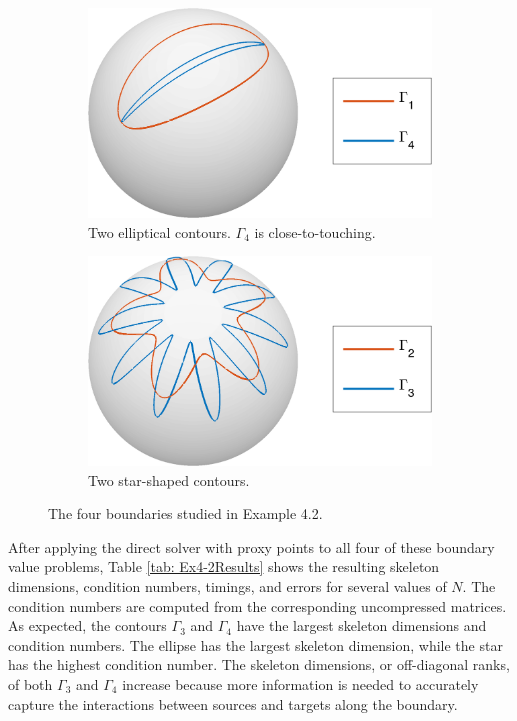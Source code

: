 \documentclass{sfuthesis}
\begin{document}
\begin{figure}[h]
        \centering
        \begin{subfigure}[b]{0.45\textwidth}
        		\includegraphics[width=\textwidth]{Ex4-2Gamma1and4}
			\caption{Two elliptical contours. $\Gamma_4$ is close-to-touching. }
     \end{subfigure} \hspace{0.5cm}
      \begin{subfigure}[b]{0.45\textwidth}
                \includegraphics[width=\textwidth]{Ex4-2Gamma2and3}
                \caption{Two star-shaped contours. \vspace{0.3cm}}
       \end{subfigure}
       \caption{The four boundaries studied in Example 4.2. }
       \label{fig: Ex4-2Domains}
\end{figure}

After applying the direct solver with proxy points to all four of these boundary value problems, Table \ref{tab: Ex4-2Results} shows the resulting skeleton dimensions, condition numbers, timings, and errors for several values of $N$. The condition numbers are computed from the corresponding uncompressed matrices. 
As expected, the contours $\Gamma_3$ and $\Gamma_4$ have the largest skeleton dimensions and condition numbers. The ellipse has the largest skeleton dimension, while the star has the highest condition number. The skeleton dimensions, or off-diagonal ranks, of both $\Gamma_3$ and $\Gamma_4$ increase because more information is needed to accurately capture the interactions between sources and targets along the boundary. 
\end{document}

